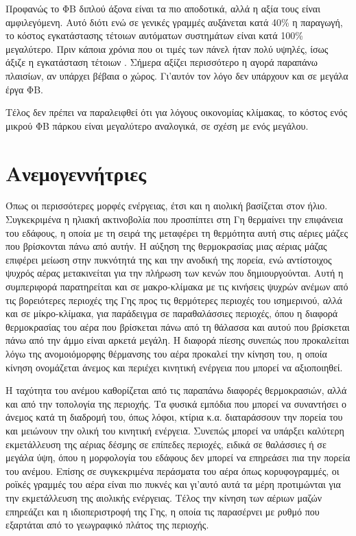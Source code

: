 \documentclass[12pt]{report}
\begin{document}
Προφανώς το ΦΒ διπλού άξονα είναι τα πιο αποδοτικά, αλλά η αξία τους είναι αμφιλεγόμενη. Αυτό διότι ενώ σε γενικές γραμμές αυξάνεται κατά 40\% η παραγωγή, το κόστος εγκατάστασης τέτοιων αυτόματων συστημάτων είναι κατά 100\%
μεγαλύτερο. Πριν κάποια χρόνια που οι τιμές των πάνελ ήταν πολύ υψηλές, ίσως άξιζε η εγκατάσταση τέτοιων {}. Σήμερα αξίζει περισσότερο η αγορά παραπάνω πλαισίων, αν υπάρχει βέβαια ο χώρος. Γι'αυτόν τον λόγο
δεν υπάρχουν και {} σε μεγάλα έργα ΦΒ.

Τέλος δεν πρέπει να παραλειφθεί ότι για λόγους οικονομίας κλίμακας, το κόστος ενός μικρού ΦΒ πάρκου είναι μεγαλύτερο αναλογικά, σε σχέση με ενός μεγάλου. 

\pagebreak
\section{Ανεμογεννήτριες}
Όπως οι περισσότερες μορφές ενέργειας, έτσι και η αιολική βασίζεται στον ήλιο. Συγκεκριμένα η ηλιακή ακτινοβολία που προσπίπτει στη Γη θερμαίνει την επιφάνεια του εδάφους, η οποία με τη σειρά της μεταφέρει τη θερμότητα αυτή 
στις αέριες μάζες που βρίσκονται πάνω από αυτήν. Η αύξηση της θερμοκρασίας μιας αέριας μάζας επιφέρει μείωση στην πυκνότητά της και την ανοδική της πορεία, ενώ αντίστοιχος ψυχρός αέρας μετακινείται για την πλήρωση των κενών
που δημιουργούνται. Αυτή η συμπεριφορά παρατηρείται και σε μακρο-κλίμακα με τις κινήσεις ψυχρών ανέμων από τις βορειότερες περιοχές της Γης προς τις θερμότερες περιοχές του ισημερινού, αλλά και σε μίκρο-κλίμακα, για παράδειγμα 
σε παραθαλάσσιες περιοχές, όπου η διαφορά θερμοκρασίας του αέρα που βρίσκεται πάνω από τη θάλασσα και αυτού που βρίσκεται πάνω από την άμμο είναι αρκετά μεγάλη. Η διαφορά πίεσης συνεπώς που προκαλείται λόγω της ανομοιόμορφης
θέρμανσης του αέρα προκαλεί την κίνηση του, η οποία κίνηση ονομάζεται άνεμος και περιέχει κινητική ενέργεια που μπορεί να αξιοποιηθεί.

Η ταχύτητα του ανέμου καθορίζεται από τις παραπάνω διαφορές θερμοκρασιών, αλλά και από την τοπολογία της περιοχής. Τα φυσικά εμπόδια που μπορεί να συναντήσει ο άνεμος κατά τη διαδρομή του, όπως λόφοι, κτίρια κ.α. διαταράσσουν την
πορεία του και μειώνουν την ολική του κινητική ενέργεια. Συνεπώς μπορεί να υπάρξει καλύτερη εκμετάλλευση της αέριας δέσμης σε επίπεδες περιοχές, ειδικά σε θαλάσσιες ή σε μεγάλα ύψη, όπου η μορφολογία του εδάφους δεν μπορεί να
επηρεάσει πια την πορεία του ανέμου. Επίσης σε συγκεκριμένα περάσματα του αέρα όπως κορυφογραμμές, οι ροϊκές γραμμές του αέρα είναι πιο πυκνές και γι'αυτό αυτά τα μέρη προτιμώνται για την εκμετάλλευση της αιολικής ενέργειας.
Τέλος την κίνηση των αέριων μαζών επηρεάζει και η ιδιοπεριστροφή της Γης, η οποία τις παρασέρνει με ρυθμό που εξαρτάται από το γεωγραφικό πλάτος της περιοχής.
\end{document}

